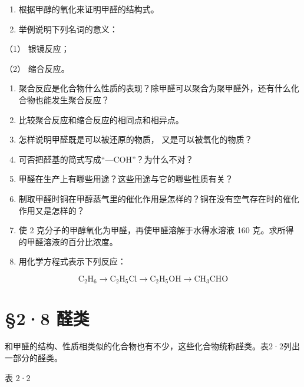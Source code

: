 \begin{enumerate}
\item
  根据甲醇的氧化来证明甲醛的结构式。
\item
  举例说明下列名词的意义：
\end{enumerate}

（1） 银镜反应；

（2） 缩合反应。

\begin{enumerate}[start=3]
\item
  聚合反应是化合物什么性质的表现？除甲醛可以聚合为聚甲醛外，还有什么化合物也能发生聚合反应？
\item
  比较聚合反应和缩合反应的相同点和相异点。
\item
  怎样说明甲醛既是可以被还原的物质， 又是可以被氧化的物质？
\item
  可否把醛基的简式写成``---COH''？为什么不对？
\item
  甲醛在生产上有哪些用途？这些用途与它的哪些性质有关？
\item
  制取甲醛时铜在甲醇蒸气里的催化作用是怎样的？铜在没有空气存在时的催化作用又是怎样的？
\item
  使 2 克分子的甲醇氧化为甲醛，再使甲醛溶解于水得水溶液 160
  克。求所得的甲醛溶液的百分比浓度。
\item
  用化学方程式表示下列反应：
\end{enumerate}

\[
\mathrm{C} _ {2} \mathrm{H} _ {6} \rightarrow \mathrm{C} _ {2} \mathrm{H} _ {5} \mathrm{Cl} \rightarrow \mathrm{C} _ {2} \mathrm{H} _ {5} \mathrm{OH} \rightarrow \mathrm{CH} _ {3} \mathrm{CHO}
\]

\section{§2·8 醛类}

和甲醛的结构、性质相类似的化合物也有不少，这些化合物统称醛类。表2·2列出一部分的醛类。

表 2·2

{\centering
\small\setlength{\tabcolsep}{3pt}%
\par
}

